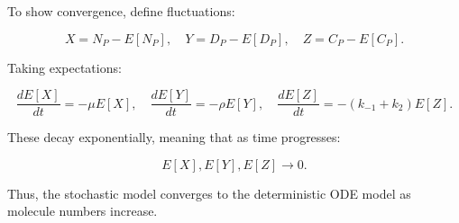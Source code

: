 \documentclass{article}
\begin{document}
To show convergence, define fluctuations:

\[
X = N_P - E[N_P], \quad Y = D_P - E[D_P], \quad Z = C_P - E[C_P].
\]

Taking expectations:

\[
\frac{dE[X]}{dt} = -\mu E[X], \quad \frac{dE[Y]}{dt} = -\rho E[Y], \quad \frac{dE[Z]}{dt} = -(k_{-1} + k_2)E[Z].
\]

These decay exponentially, meaning that as time progresses:

\[
E[X], E[Y], E[Z] \to 0.
\]

Thus, the stochastic model converges to the deterministic ODE model as molecule numbers increase.
\end{document}

